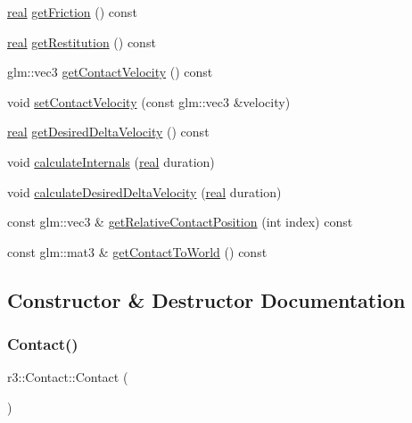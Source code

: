 \begin{DoxyCompactItemize}
\item 
\mbox{\hyperlink{namespacer3_ab2016b3e3f743fb735afce242f0dc1eb}{real}} \mbox{\hyperlink{classr3_1_1_contact_a1a547c3852733960001cc5fe0fe06790}{get\+Friction}} () const
\item 
\mbox{\hyperlink{namespacer3_ab2016b3e3f743fb735afce242f0dc1eb}{real}} \mbox{\hyperlink{classr3_1_1_contact_a8ec701dcaf82e7fc65bc6c4a2cb6987e}{get\+Restitution}} () const
\item 
glm\+::vec3 \mbox{\hyperlink{classr3_1_1_contact_a733cdbf54fe22bdaaa55a55868ad14ac}{get\+Contact\+Velocity}} () const
\item 
void \mbox{\hyperlink{classr3_1_1_contact_a7ccc2c56a4dcc5b16967f9832fea87ab}{set\+Contact\+Velocity}} (const glm\+::vec3 \&velocity)
\item 
\mbox{\hyperlink{namespacer3_ab2016b3e3f743fb735afce242f0dc1eb}{real}} \mbox{\hyperlink{classr3_1_1_contact_aff234679aa4302b69b8dd101eb969705}{get\+Desired\+Delta\+Velocity}} () const
\item 
void \mbox{\hyperlink{classr3_1_1_contact_a4e00a32cb21ff4fc8ec826f163bcddae}{calculate\+Internals}} (\mbox{\hyperlink{namespacer3_ab2016b3e3f743fb735afce242f0dc1eb}{real}} duration)
\item 
void \mbox{\hyperlink{classr3_1_1_contact_a3f2c146006389bf6273cdd078763b7a3}{calculate\+Desired\+Delta\+Velocity}} (\mbox{\hyperlink{namespacer3_ab2016b3e3f743fb735afce242f0dc1eb}{real}} duration)
\item 
const glm\+::vec3 \& \mbox{\hyperlink{classr3_1_1_contact_ade5794f7055fb30ff52f9193b92c6bf0}{get\+Relative\+Contact\+Position}} (int index) const
\item 
const glm\+::mat3 \& \mbox{\hyperlink{classr3_1_1_contact_a4e9692d870bdba44ff6b627b8c6c6e30}{get\+Contact\+To\+World}} () const
\end{DoxyCompactItemize}


\subsection{Constructor \& Destructor Documentation}
\mbox{\label{classr3_1_1_contact_af2648c9a1e37583ac230a40f4fc6b72d}} 
\subsubsection{\texorpdfstring{Contact()}{Contact()}}
{\footnotesize\ttfamily r3\+::\+Contact\+::\+Contact (\begin{DoxyParamCaption}{ }\end{DoxyParamCaption})\hspace{0.3cm}{\ttfamily [explicit]}}


